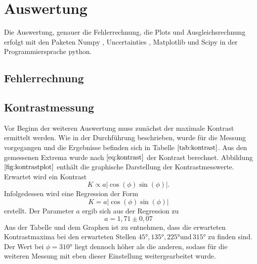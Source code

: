 \section{Auswertung}
Die Auswertung, genauer die Fehlerrechnung, die Plots und Ausgleichsrechnung erfolgt mit den Paketen
Numpy \cite{numpy}, Uncertainties \cite{uncertainties}, Matplotlib \cite{matplotlib} und Scipy \cite{scipy} in der Programmiersprache python.
\subsection{Fehlerrechnung}

\subsection{Kontrastmessung}
Vor Beginn der weiteren Auswertung muss zunächst der maximale Kontrast ermittelt werden.
Wie in der Durchführung beschrieben, wurde für die Messung vorgegangen und die Ergebnisse befinden sich in Tabelle $\ref{tab:kontrast}$.
Aus den gemessenen Extrema wurde nach $\ref{eq:kontrast}$ der Kontrast berechnet.
Abbildung $\ref{fig:kontrastplot}$ enthält die graphische Darstellung der Kontrastmesswerte.
Erwartet wird ein Kontrast
\begin{equation}
  K \propto a|\cos(\phi)\sin(\phi)|.
\end{equation}
Infolgedessen wird eine Regression der Form
\begin{equation}
  K = a|\cos(\phi)\sin(\phi)|
\end{equation}
erstellt. Der Parameter $a$ ergib sich aus der Regression zu
\begin{equation*}
  a = 1,71 \pm 0,07
\end{equation*}
Aus der Tabelle und dem Graphen ist zu entnehmen, dass die erwarteten Kontrastmaxima bei den erwarteten Stellen $45° , 135° , 225° \text{und} \, 315°$ zu finden sind.
Der Wert bei $\phi = 310°$ liegt dennoch höher als die anderen, sodass für die weiteren Messung mit eben dieser Einstellung weitergearbeitet wurde.
